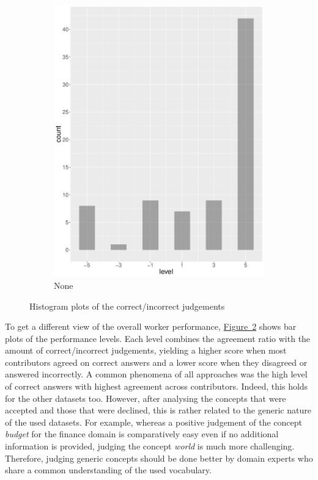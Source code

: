 \begin{figure}
\begin{subfigure}[b]{0.4\textwidth}
        \includegraphics[width=\textwidth]{plots/finance/hist_level_none}
        \caption{None}
        \label{fig:hist_level_finance_none}
    \end{subfigure}
    \caption{Histogram plots of the correct/incorrect judgements}\label{fig:hist_level_finance_all}
\end{figure}

To get a different view of the overall worker performance, \hyperref[fig:hist_level_finance_all]{Figure~\ref*{fig:hist_level_finance_all}} 
shows bar plots of the performance levels. Each level combines the agreement ratio with the amount of correct/incorrect judgements, yielding a higher score when most contributors agreed on correct answers and a lower score when they disagreed or answered incorrectly.
A common phenomena of all approaches was the high level of correct answers with highest agreement across contributors. Indeed, this holds for the other datasets too. However, after analysing the concepts that were accepted and those that were declined, this is rather related to the generic nature of the used datasets. For example, whereas a positive judgement of the concept \emph{budget} for the finance domain is comparatively easy even if no additional information is provided, judging the concept \emph{world} is much more challenging. Therefore, judging generic concepts should be done better by domain experts who share a common understanding of the used vocabulary. 


